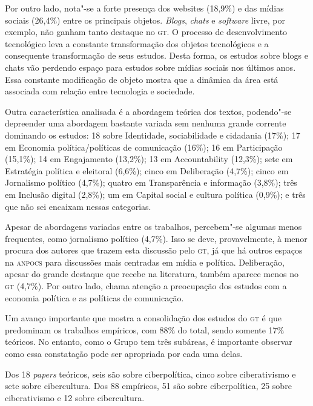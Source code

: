 Por outro lado, nota"-se a forte presença dos websites (18,9\%) e das
mídias sociais (26,4\%) entre os principais objetos. \emph{Blogs},
\emph{chats} e \emph{software} livre, por exemplo, não ganham tanto
destaque no \textsc{gt}. O processo de desenvolvimento tecnológico leva a
constante transformação dos objetos tecnológicos e a consequente
transformação de seus estudos. Desta forma, os estudos sobre blogs e
chats vão perdendo espaço para estudos sobre mídias sociais nos últimos
anos. Essa constante modificação de objeto mostra que a dinâmica da área
está associada com relação entre tecnologia e sociedade.

Outra característica analisada é a abordagem teórica dos textos,
podendo"-se depreender uma abordagem bastante variada sem nenhuma grande
corrente dominando os estudos: 18 sobre Identidade, sociabilidade e cidadania (17\%); 17 em Economia política/políticas de comunicação (16\%); 16 em Participação (15,1\%); 14 em Engajamento (13,2\%); 13 em Accountability (12,3\%); sete em Estratégia política e eleitoral (6,6\%); cinco em Deliberação (4,7\%); cinco em Jornalismo político (4,7\%); quatro em Transparência e informação (3,8\%); três em Inclusão digital (2,8\%); um em Capital social e cultura política (0,9\%); e três que não sei encaixam nessas categorias.

Apesar de abordagens variadas entre os trabalhos, percebem"-se algumas
menos frequentes, como jornalismo político (4,7\%). Isso se deve,
provavelmente, à menor procura dos autores que trazem esta
discussão pelo \textsc{gt}, já que há outros espaços na \textsc{\textsc{anpocs}} para discussões
mais centradas em mídia e política. Deliberação, apesar do grande
destaque que recebe na literatura, também aparece menos no \textsc{gt} (4,7\%).
Por outro lado, chama atenção a preocupação dos estudos com a economia
política e as políticas de comunicação.

Um avanço importante que mostra a consolidação dos estudos do \textsc{gt} é que
predominam os trabalhos empíricos, com 88\% do total, sendo somente 17\%
teóricos. No entanto, como o Grupo tem três subáreas, é importante
observar como essa constatação pode ser apropriada por cada uma delas.

Dos 18 \textit{papers} teóricos, seis são sobre ciberpolítica, cinco sobre ciberativismo e sete sobre cibercultura. Dos 88 empíricos, 51 são sobre ciberpolítica, 25 sobre ciberativismo e 12 sobre cibercultura.

